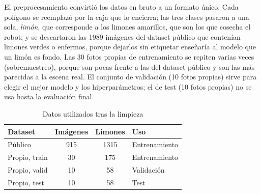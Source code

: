 \documentclass[conference]{IEEEtran}
\begin{document}
El preprocesamiento convirtió los datos en bruto a un formato único. Cada polígono se reemplazó por la caja que lo encierra; las tres clases pasaron a una sola, \textit{limón}, que corresponde a los limones amarillos, que son los que cosecha el robot; y se descartaron las 1989 imágenes del dataset público que contenían limones verdes o enfermos, porque dejarlos sin etiquetar enseñaría al modelo que un limón es fondo. Las 30 fotos propias de entrenamiento se repiten varias veces (sobremuestreo), porque son pocas frente a las del dataset público y son las más parecidas a la escena real. El conjunto de validación (10 fotos propias) sirve para elegir el mejor modelo y los hiperparámetros; el de test (10 fotos propias) no se usa hasta la evaluación final.

\begin{table}[t]
\caption{Datos utilizados tras la limpieza}
\label{tab:datos}
\centering
\small
\begin{tabular}{lccl}
\toprule
\textbf{Dataset} & \textbf{Imágenes} & \textbf{Limones} & \textbf{Uso} \\
\midrule
Público & 915 & 1315 & Entrenamiento \\
Propio, train & 30 & 175 & Entrenamiento \\
Propio, valid & 10 & 58 & Validación \\
Propio, test & 10 & 58 & Test \\
\bottomrule
\end{tabular}
\end{table}
\end{document}
